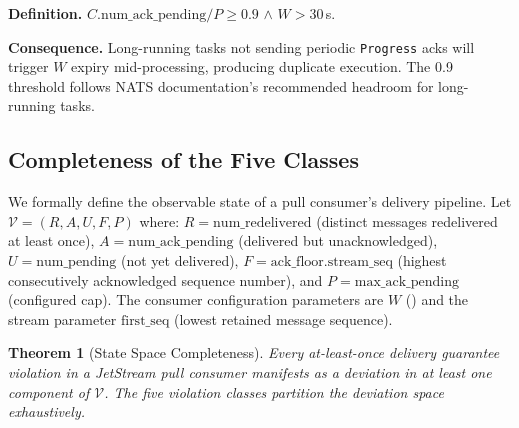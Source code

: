 \documentclass[journal]{IEEEtran}
\newtheorem{theorem}{Theorem}
\begin{document}
\textbf{Definition.} $C.\text{num\_ack\_pending} / P \geq 0.9$
$\wedge$ $W > 30$\,s.

\textbf{Consequence.} Long-running tasks not sending periodic
\texttt{Progress} acks will trigger $W$ expiry mid-processing, producing
duplicate execution. The 0.9 threshold follows NATS documentation's
recommended headroom for long-running tasks.

\subsection{Completeness of the Five Classes}
\label{sec:completeness}

We formally define the observable state of a pull consumer's delivery
pipeline. Let $\mathcal{V} = (R, A, U, F, P)$ where:
$R = \text{num\_redelivered}$ (distinct messages redelivered at least once),
$A = \text{num\_ack\_pending}$ (delivered but unacknowledged),
$U = \text{num\_pending}$ (not yet delivered),
$F = \text{ack\_floor.stream\_seq}$ (highest consecutively acknowledged
sequence number), and
$P = \text{max\_ack\_pending}$ (configured cap).
The consumer configuration parameters are $W$ () and the
stream parameter $\text{first\_seq}$ (lowest retained message sequence).

\begin{theorem}[State Space Completeness]
\label{thm:completeness}
Every at-least-once delivery guarantee violation in a JetStream pull consumer
manifests as a deviation in at least one component of $\mathcal{V}$.
The five violation classes partition the deviation space exhaustively.
\end{theorem}
\end{document}
